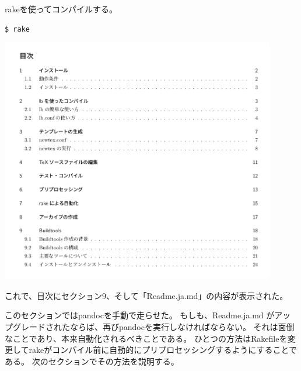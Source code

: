 rakeを使ってコンパイルする。
\begin{verbatim}
$ rake
\end{verbatim}

\begin{center}
\includegraphics[width=12cm]{tableofcontents.png}
\end{center}

これで、目次にセクション9、そして「Readme.ja.md」の内容が表示された。

このセクションではpandocを手動で走らせた。
もしも、Readme.ja.md がアップグレードされたならば、再びpandocを実行しなければならない。
それは面倒なことであり、本来自動化されるべきことである。
ひとつの方法はRakefileを変更してrakeがコンパイル前に自動的にプリプロセッシングするようにすることである。
次のセクションでその方法を説明する。

